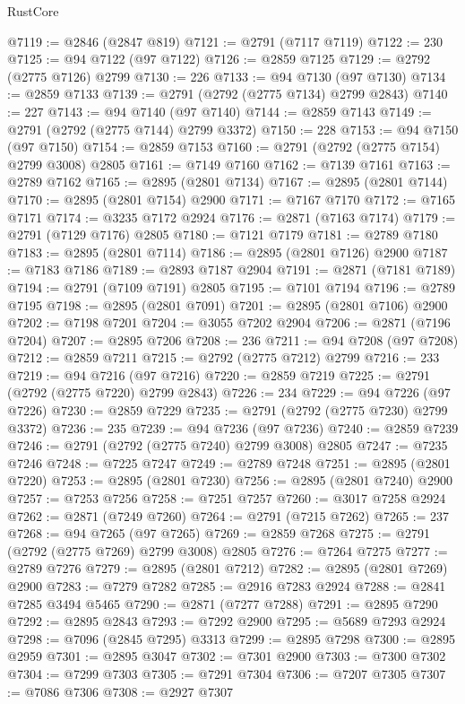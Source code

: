 \begin{lexlean}{RustCore}
\begin{coremodule}
@7119 := @2846 (@2847 @819)
@7121 := @2791 (@7117 @7119)
@7122 := 230
@7125 := @94 @7122 (@97 @7122)
@7126 := @2859 @7125
@7129 := @2792 (@2775 @7126) @2799
@7130 := 226
@7133 := @94 @7130 (@97 @7130)
@7134 := @2859 @7133
@7139 := @2791 (@2792 (@2775 @7134) @2799 @2843)
@7140 := 227
@7143 := @94 @7140 (@97 @7140)
@7144 := @2859 @7143
@7149 := @2791 (@2792 (@2775 @7144) @2799 @3372)
@7150 := 228
@7153 := @94 @7150 (@97 @7150)
@7154 := @2859 @7153
@7160 := @2791 (@2792 (@2775 @7154) @2799 @3008) @2805
@7161 := @7149 @7160
@7162 := @7139 @7161
@7163 := @2789 @7162
@7165 := @2895 (@2801 @7134)
@7167 := @2895 (@2801 @7144)
@7170 := @2895 (@2801 @7154) @2900
@7171 := @7167 @7170
@7172 := @7165 @7171
@7174 := @3235 @7172 @2924
@7176 := @2871 (@7163 @7174)
@7179 := @2791 (@7129 @7176) @2805
@7180 := @7121 @7179
@7181 := @2789 @7180
@7183 := @2895 (@2801 @7114)
@7186 := @2895 (@2801 @7126) @2900
@7187 := @7183 @7186
@7189 := @2893 @7187 @2904
@7191 := @2871 (@7181 @7189)
@7194 := @2791 (@7109 @7191) @2805
@7195 := @7101 @7194
@7196 := @2789 @7195
@7198 := @2895 (@2801 @7091)
@7201 := @2895 (@2801 @7106) @2900
@7202 := @7198 @7201
@7204 := @3055 @7202 @2904
@7206 := @2871 (@7196 @7204)
@7207 := @2895 @7206
@7208 := 236
@7211 := @94 @7208 (@97 @7208)
@7212 := @2859 @7211
@7215 := @2792 (@2775 @7212) @2799
@7216 := 233
@7219 := @94 @7216 (@97 @7216)
@7220 := @2859 @7219
@7225 := @2791 (@2792 (@2775 @7220) @2799 @2843)
@7226 := 234
@7229 := @94 @7226 (@97 @7226)
@7230 := @2859 @7229
@7235 := @2791 (@2792 (@2775 @7230) @2799 @3372)
@7236 := 235
@7239 := @94 @7236 (@97 @7236)
@7240 := @2859 @7239
@7246 := @2791 (@2792 (@2775 @7240) @2799 @3008) @2805
@7247 := @7235 @7246
@7248 := @7225 @7247
@7249 := @2789 @7248
@7251 := @2895 (@2801 @7220)
@7253 := @2895 (@2801 @7230)
@7256 := @2895 (@2801 @7240) @2900
@7257 := @7253 @7256
@7258 := @7251 @7257
@7260 := @3017 @7258 @2924
@7262 := @2871 (@7249 @7260)
@7264 := @2791 (@7215 @7262)
@7265 := 237
@7268 := @94 @7265 (@97 @7265)
@7269 := @2859 @7268
@7275 := @2791 (@2792 (@2775 @7269) @2799 @3008) @2805
@7276 := @7264 @7275
@7277 := @2789 @7276
@7279 := @2895 (@2801 @7212)
@7282 := @2895 (@2801 @7269) @2900
@7283 := @7279 @7282
@7285 := @2916 @7283 @2924
@7288 := @2841 @7285 @3494 @5465
@7290 := @2871 (@7277 @7288)
@7291 := @2895 @7290
@7292 := @2895 @2843
@7293 := @7292 @2900
@7295 := @5689 @7293 @2924
@7298 := @7096 (@2845 @7295) @3313
@7299 := @2895 @7298
@7300 := @2895 @2959
@7301 := @2895 @3047
@7302 := @7301 @2900
@7303 := @7300 @7302
@7304 := @7299 @7303
@7305 := @7291 @7304
@7306 := @7207 @7305
@7307 := @7086 @7306
@7308 := @2927 @7307

\end{coremodule}
\end{lexlean}
